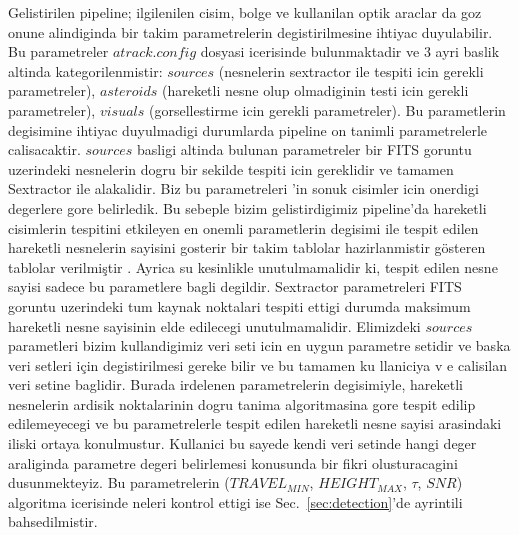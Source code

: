 \documentclass[review]{elsarticle}
\begin{document}
Gelistirilen pipeline; ilgilenilen cisim, bolge ve kullanilan optik araclar da goz onune alindiginda bir takim parametrelerin degistirilmesine ihtiyac duyulabilir. Bu parametreler $atrack.config$ dosyasi icerisinde bulunmaktadir ve 3 ayri baslik altinda kategorilenmistir: $sources$ (nesnelerin sextractor ile tespiti icin gerekli parametreler), $asteroids$ (hareketli nesne olup olmadiginin testi icin gerekli parametreler), $visuals$ (gorsellestirme icin gerekli parametreler). Bu parametlerin degisimine ihtiyac duyulmadigi durumlarda pipeline on tanimli parametrelerle calisacaktir. $sources$ basligi altinda bulunan parametreler bir FITS goruntu uzerindeki nesnelerin dogru bir sekilde tespiti icin gereklidir ve tamamen Sextractor ile alakalidir. Biz bu parametreleri \citep{bertin1996}'in sonuk cisimler icin onerdigi degerlere gore belirledik. Bu sebeple bizim gelistirdigimiz pipeline'da hareketli cisimlerin tespitini etkileyen en onemli parametlerin degisimi ile tespit edilen hareketli nesnelerin sayisini gosterir bir takim tablolar hazirlanmistir gösteren tablolar verilmiştir . Ayrica su kesinlikle unutulmamalidir ki, tespit edilen nesne sayisi sadece bu parametlere bagli degildir. Sextractor parametreleri FITS goruntu uzerindeki tum kaynak noktalari tespiti ettigi durumda maksimum hareketli nesne sayisinin elde edilecegi unutulmamalidir. Elimizdeki $sources$ parametleri bizim kullandigimiz veri seti icin en uygun parametre setidir ve baska veri setleri için degistirilmesi gereke
bilir ve bu
 tamamen ku
llaniciya v
e calisilan veri setine baglidir. Burada irdelenen parametrelerin degisimiyle, hareketli nesnelerin ardisik noktalarinin dogru tanima algoritmasina gore tespit edilip edilemeyecegi ve bu parametrelerle tespit edilen hareketli nesne sayisi arasindaki iliski ortaya konulmustur. Kullanici bu sayede kendi veri setinde hangi deger araliginda parametre degeri belirlemesi konusunda bir fikri olusturacagini dusunmekteyiz. Bu parametrelerin ($TRAVEL_{MIN}$, $HEIGHT_{MAX}$, $\tau$, $SNR$) algoritma icerisinde neleri kontrol ettigi ise Sec.~\ref{sec:detection}'de ayrintili bahsedilmistir. 
\end{document}
